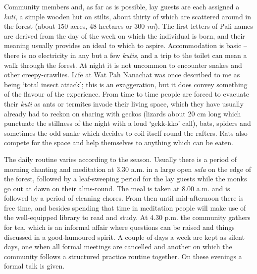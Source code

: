 Community members and, as far as is possible, lay guests are each
assigned a \emph{kuti}, a simple wooden hut on stilts, about thirty of
which are scattered around in the forest (about 150 acres, 48 hectares
or 300 \emph{rai}). The first letters of Pali names are derived from the
day of the week on which the individual is born, and their meaning
usually provides an ideal to which to aspire. Accommodation is basic --
there is no electricity in any but a few \emph{kutis}, and a trip to the
toilet can mean a walk through the forest. At night it is not uncommon
to encounter snakes and other creepy-crawlies. Life at Wat Pah Nanachat
was once described to me as being `total insect attack'; this is an
exaggeration, but it does convey something of the flavour of the
experience. From time to time people are forced to evacuate their
\emph{kuti} as ants or termites invade their living space, which they
have usually already had to reckon on sharing with geckos (lizards about
20 cm long which punctuate the stillness of the night with a loud
`gekk-kko' call), bats, spiders and sometimes the odd snake which
decides to coil itself round the rafters. Rats also compete for the
space and help themselves to anything which can be eaten.

The daily routine varies according to the season. Usually there is a
period of morning chanting and meditation at 3.30 a.m. in a large open
\emph{sala} on the edge of the forest, followed by a leaf-sweeping
period for the lay guests while the monks go out at dawn on their
alms-round. The meal is taken at 8.00 a.m. and is followed by a period
of cleaning chores. From then until mid-afternoon there is free time,
and besides spending that time in meditation people will make use of the
well-equipped library to read and study. At 4.30 p.m. the community
gathers for tea, which is an informal affair where questions can be
raised and things discussed in a good-humoured spirit. A couple of days
a week are kept as silent days, one when all formal meetings are
cancelled and another on which the community follows a structured
practice routine together. On these evenings a formal talk is given.

